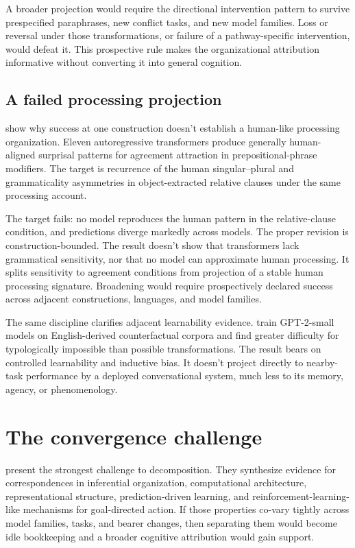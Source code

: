 \documentclass[12pt]{article}
\begin{document}
A broader projection would require the directional intervention pattern to survive prespecified paraphrases, new conflict tasks, and new model families. Loss or reversal under those transformations, or failure of a pathway-specific intervention, would defeat it. This prospective rule makes the organizational attribution informative without converting it into general cognition.

\subsection{A failed processing projection}

\textcite{vondermalsburg2026} show why success at one construction doesn't establish a human-like processing organization. Eleven autoregressive transformers produce generally human-aligned surprisal patterns for agreement attraction in prepositional-phrase modifiers. The target is recurrence of the human singular--plural and grammaticality asymmetries in object-extracted relative clauses under the same processing account.

The target fails: no model reproduces the human pattern in the relative-clause condition, and predictions diverge markedly across models. The proper revision is construction-bounded. The result doesn't show that transformers lack grammatical sensitivity, nor that no model can approximate human processing. It splits sensitivity to agreement conditions from projection of a stable human processing signature. Broadening would require prospectively declared success across adjacent constructions, languages, and model families.

The same discipline clarifies adjacent learnability evidence. \textcite{kallini2024} train GPT-2-small models on English-derived counterfactual corpora and find greater difficulty for typologically impossible than possible transformations. The result bears on controlled learnability and inductive bias. It doesn't project directly to nearby-task performance by a deployed conversational system, much less to its memory, agency, or phenomenology.

\section{The convergence challenge}

\textcite{sripadaLewis2026CognitiveConvergence} present the strongest challenge to decomposition. They synthesize evidence for correspondences in inferential organization, computational architecture, representational structure, prediction-driven learning, and reinforcement-learning-like mechanisms for goal-directed action. If those properties co-vary tightly across model families, tasks, and bearer changes, then separating them would become idle bookkeeping and a broader cognitive attribution would gain support.
\end{document}
